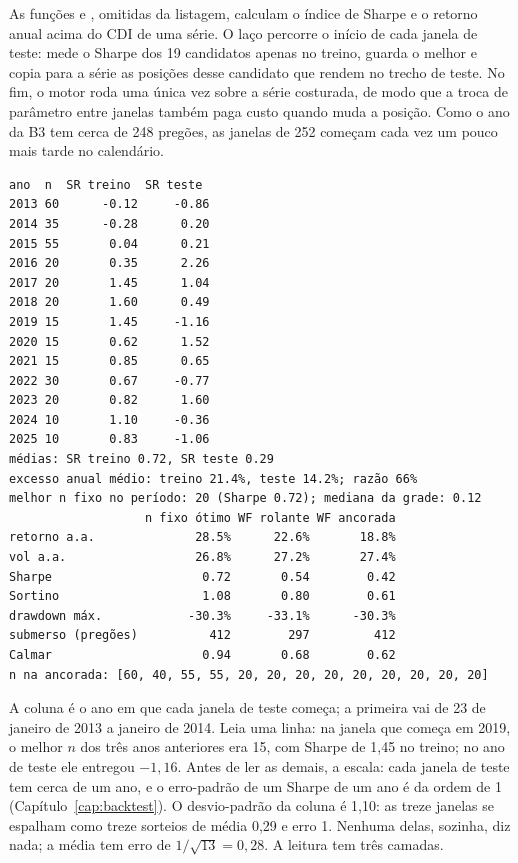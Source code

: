 

As funções  e , omitidas da listagem, calculam o índice de Sharpe e o retorno anual acima do CDI de uma série. O laço percorre o início de cada janela de teste: mede o Sharpe dos 19 candidatos apenas no treino, guarda o melhor e copia para a série  as posições desse candidato que rendem no trecho de teste. No fim, o motor roda uma única vez sobre a série costurada, de modo que a troca de parâmetro entre janelas também paga custo quando muda a posição. Como o ano da B3 tem cerca de 248 pregões, as janelas de 252 começam cada vez um pouco mais tarde no calendário.

\begin{lstlisting}[style=saida]
 ano  n  SR treino  SR teste
2013 60      -0.12     -0.86
2014 35      -0.28      0.20
2015 55       0.04      0.21
2016 20       0.35      2.26
2017 20       1.45      1.04
2018 20       1.60      0.49
2019 15       1.45     -1.16
2020 15       0.62      1.52
2021 15       0.85      0.65
2022 30       0.67     -0.77
2023 20       0.82      1.60
2024 10       1.10     -0.36
2025 10       0.83     -1.06
médias: SR treino 0.72, SR teste 0.29
excesso anual médio: treino 21.4%, teste 14.2%; razão 66%
melhor n fixo no período: 20 (Sharpe 0.72); mediana da grade: 0.12
                   n fixo ótimo WF rolante WF ancorada
retorno a.a.              28.5%      22.6%       18.8%
vol a.a.                  26.8%      27.2%       27.4%
Sharpe                     0.72       0.54        0.42
Sortino                    1.08       0.80        0.61
drawdown máx.            -30.3%     -33.1%      -30.3%
submerso (pregões)          412        297         412
Calmar                     0.94       0.68        0.62
n na ancorada: [60, 40, 55, 55, 20, 20, 20, 20, 20, 20, 20, 20, 20]
\end{lstlisting}

A coluna  é o ano em que cada janela de teste começa; a primeira vai de 23 de janeiro de 2013 a janeiro de 2014. Leia uma linha: na janela que começa em 2019, o melhor $n$ dos três anos anteriores era 15, com Sharpe de 1,45 no treino; no ano de teste ele entregou $-1,16$. Antes de ler as demais, a escala: cada janela de teste tem cerca de um ano, e o erro-padrão de um Sharpe de um ano é da ordem de 1 (Capítulo~\ref{cap:backtest}). O desvio-padrão da coluna  é 1,10: as treze janelas se espalham como treze sorteios de média 0,29 e erro 1. Nenhuma delas, sozinha, diz nada; a média tem erro de $1/\sqrt{13} = 0,28$. A leitura tem três camadas.

